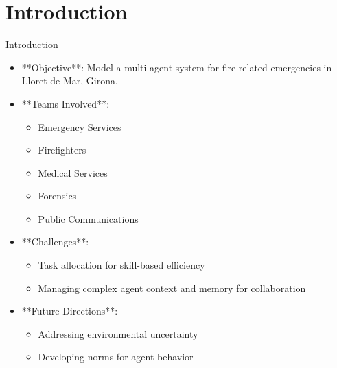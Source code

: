 \section{Introduction}
\begin{frame}{Introduction}
    \begin{itemize}
        \item **Objective**: Model a multi-agent system for fire-related emergencies in Lloret de Mar, Girona.
        \item **Teams Involved**:
            \begin{itemize}
                \item Emergency Services
                \item Firefighters
                \item Medical Services
                \item Forensics
                \item Public Communications
            \end{itemize}
        \item **Challenges**:
            \begin{itemize}
                \item Task allocation for skill-based efficiency \cite{han2024llmmultiagentsystemschallenges}
                \item Managing complex agent context and memory for collaboration
            \end{itemize}
        \item **Future Directions**:
            \begin{itemize}
                \item Addressing environmental uncertainty \cite{berthon2024naturalstrategicabilitystochastic}
                \item Developing norms for agent behavior \cite{morales2017synthesisingevolutionarilystablenormative}
            \end{itemize}
    \end{itemize}
\end{frame}